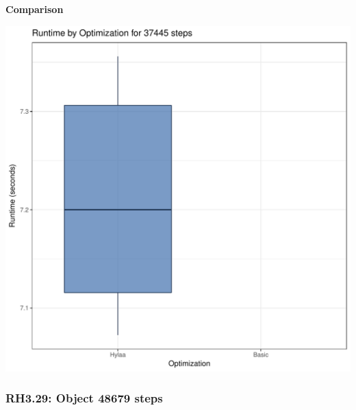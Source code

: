 \documentclass{article}\usepackage[]{graphicx}\usepackage[]{color}
\makeatletter
\def\maxwidth{ %
  \ifdim\Gin@nat@width>\linewidth
    \linewidth
  \else
    \Gin@nat@width
  \fi
}
\newenvironment{knitrout}{}{} %
\makeatother
\begin{document}
 \textbf{Comparison}
  
\begin{knitrout}
\color{fgcolor}
\includegraphics[width=\maxwidth]{figure/RH3_steps37445-1} 

\end{knitrout}


\subsubsection{RH3.29: Object 48679 steps}
\end{document}
